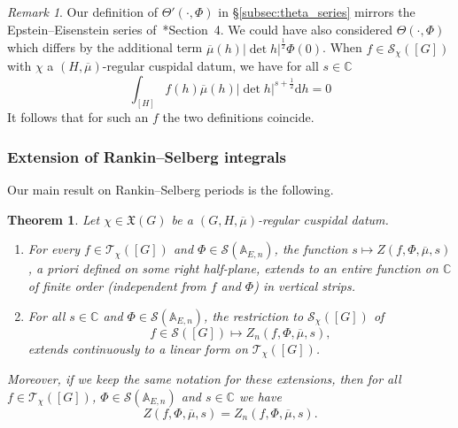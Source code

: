 \documentclass[letterpaper,11pt]{amsart}
\newcommand{\bA}{\mathbb{A}}
\newcommand{\C}{\mathbb{C}}
\newcommand{\cS}{\mathcal{S}}
\newcommand{\rd}{\mathrm{d}}
\newcommand{\<}{\negthickspace}
\newcommand{\valP}[1]{\left|#1\right|}
\theoremstyle{definition}
\theoremstyle{plain}
\newtheorem{theorem}[definition]{Theorem}
\theoremstyle{remark}
\newtheorem{remark}[definition]{Remark}
\numberwithin{equation}{section}
\begin{document}
\begin{remark}  \label{remark:mirabolic}
Our definition of $\Theta'(\cdot,\Phi)$ in \S\ref{subsec:theta_series} mirrors the Epstein--Eisenstein series
of~\cite{JS}*{Section~4}. We could have also considered $\Theta(\cdot,\Phi)$ which differs by the additional term $\overline{\mu}(h)\valP{\det h}^{\frac{1}{2}} \Phi(0)$. When $f \in \cS_{\chi}([G])$ with $\chi$
a $(H, \overline{\mu})$-regular cuspidal datum, we have for all $s \in \C$
    \[
    \int_{[H]} f(h) \overline{\mu}(h) \valP{\det h}^{s+\frac{1}{2}} \rd h=0
    \]
It follows that for such an $f$ the two definitions coincide.
\end{remark}


\subsubsection{Extension of Rankin--Selberg integrals}

Our main result on Rankin--Selberg periods is the following. 


\begin{theorem} \label{thm:RS}
Let $\chi \in \mathfrak{X}(G)$ be a $(G,H,\overline{\mu})$-regular cuspidal datum.

\begin{enumerate}
    \item For every $f \in \mathcal{T}_\chi([G])$ and $\Phi \in
        \cS(\bA_{E,n})$, the function $s \mapsto
        Z(f,\Phi, \overline{\mu}, s)$, a priori defined on some
        right half-plane, extends to an entire function on $\C$ of finite order (independent from $f$ and $\Phi$) in vertical strips.

    \item For all $s \in \C$ and $\Phi \in \cS(\bA_{E,n})$, the restriction to $\cS_\chi([G])$
        of 
        \begin{equation*}
        f \in \cS([G])  \mapsto Z_{n}(f,\Phi,\overline{\mu}, s),
        \end{equation*}
        extends continuously to a linear form on
        $\mathcal{T}_\chi([G])$.
\end{enumerate}
Moreover, if we keep the same notation for these extensions, then for all $f \in
\mathcal{T}_{\chi}([G])$, $\Phi \in \cS(\bA_{E,n})$ and $s \in \C$ we have
    \begin{equation}    \label{eq:RS_equality}
    Z(f, \Phi, \overline{\mu}, s)=Z_n(f, \Phi,\overline{\mu}, s).
    \end{equation}
\end{theorem}
\end{document}
